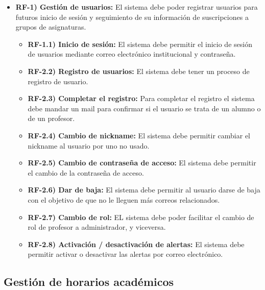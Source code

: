 \begin{itemize}
    \item \textbf{RF-1) Gestión de usuarios:} El sistema debe poder registrar usuarios para futuros inicio de sesión y seguimiento de su información de suscripciones a grupos de asignaturas.
    \begin{itemize}
        \item \textbf{RF-1.1) Inicio de sesión:} El sistema debe permitir el inicio de sesión de usuarios mediante correo electrónico institucional y contraseña.
        \item \textbf{RF-2.2) Registro de usuarios:} El sistema debe tener un proceso de registro de usuario.
        \item \textbf{RF-2.3) Completar el registro:} Para completar el registro el sistema debe mandar un mail para confirmar si el usuario se trata de un alumno o de un profesor.
        \item \textbf{RF-2.4) Cambio de nickname:} El sistema debe permitir cambiar el nickname al usuario por uno no usado.
        \item \textbf{RF-2.5) Cambio de contraseña de acceso:} El sistema debe permitir el cambio de la contraseña de acceso.
        \item \textbf{RF-2.6) Dar de baja:} El sistema debe permitir al usuario darse de baja con el objetivo de que no le lleguen más correos relacionados.
        \item \textbf{RF-2.7) Cambio de rol:} EL sistema debe poder facilitar el cambio de rol de profesor a administrador, y viceversa.
        \item \textbf{RF-2.8) Activación / desactivación de alertas:} El sistema debe permitir activar o desactivar las alertas por correo electrónico.
    \end{itemize}
\end{itemize}

\subsection{Gestión de horarios académicos}


